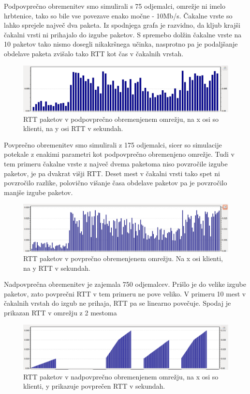 \documentclass[11pt, a4paper, slovene]{book}
\begin{document}
Podpovprečno obremenitev smo simulirali s 75 odjemalci, omrežje ni imelo hrbtenice, tako so bile vse povezave enako močne - 10Mb/s. Čakalne vrste so lahko sprejele največ dva paketa. Iz spodnjega grafa je razvidno, da kljub krajši čakalni vrsti ni prihajalo do izgube paketov. S spremebo dolžin čakalne vrste na 10 paketov tako nismo dosegli nikakršnega učinka, nasprotno pa je podaljšanje obdelave paketa zvišalo tako RTT kot čas v čakalnih vrstah. 

\begin{figure}[h]
	\centering
	\includegraphics[width=\textwidth]{lRtt1.png}
	\caption{RTT paketov v podpovprečno obremenjenem omrežju, na x osi so klienti, na y osi RTT v sekundah.}
	\label{RTT1}	
\end{figure}
\pagebreak
Povprečno obremenitev smo simulirali z 175 odjemalci, sicer so simulacije potekale z enakimi parametri kot podpovprečno obremenjeno omrežje. Tudi v tem primeru čakalne vrste z največ dvema paketoma niso povzročile izgube paketov, je pa dvakrat višji RTT. Deset mest v čakalni vrsti tako spet ni povzročilo razlike, polovično višanje časa obdelave paketov pa je povzročilo manjše izgube paketov.

\begin{figure}[h]
	\centering
	\includegraphics[width=\textwidth]{aRtt1.png}
	\caption{RTT paketov v povprečno obremenjenem omrežju. Na x osi klienti, na y RTT v sekundah.}
	\label{RTT2}	
\end{figure}

Nadpovprečna obremenitev je zajemala 750 odjemalcev. Prišlo je do velike izgube paketov, zato povprečni RTT v tem primeru ne pove veliko.  V primeru 10 mest v čakalnih vrstah do izgub ne prihaja, RTT pa se linearno povečuje. Spodaj je prikazan RTT v omrežju z 2 mestoma 

\begin{figure}[h]
	\centering
	\includegraphics[width=\textwidth]{hRtt1.png}
	\caption{RTT paketov v nadpovprečno obremenjenem omrežju, na x osi so klienti, y prikazuje povprečen RTT v sekundah.}
	\label{RTT3}	
\end{figure}
\end{document}
